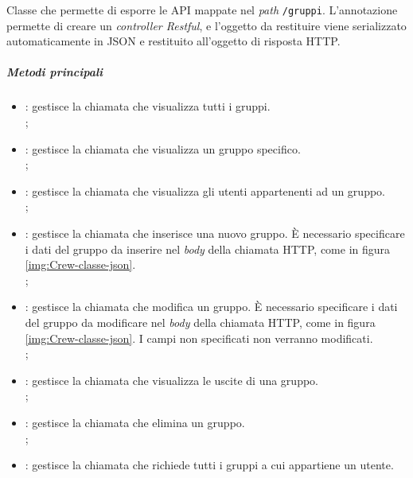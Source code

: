 \label{par:GruppiController}
Classe che permette di esporre le \gls{API} mappate nel \textit{path}
\texttt{/gruppi}.
L'annotazione  permette di creare un \textit{controller
    Restful}, e l'oggetto da restituire viene serializzato automaticamente in
JSON
e restituito all'oggetto di risposta HTTP.
\subparagraph*{Metodi principali}
\begin{itemize}
    \item {}: gestisce la chiamata che visualizza tutti i
          gruppi.\\ ;
    \item {}:  gestisce la chiamata che visualizza un gruppo
          specifico. \\ ;
    \item {}: gestisce la chiamata che visualizza gli
          utenti appartenenti ad un gruppo. \\
          ;
    \item {}: gestisce la chiamata che inserisce una nuovo
          gruppo. È necessario specificare i dati del gruppo da inserire nel
          \textit{body} della chiamata HTTP, come in figura
          \ref{img:Crew-classe-json}.
          \\ ;
    \item {}: gestisce la chiamata che modifica un gruppo. È
          necessario specificare i dati del gruppo da modificare nel
          \textit{body} della
          chiamata HTTP, come in figura \ref{img:Crew-classe-json}. I campi non
          specificati non verranno modificati. \\
          ;
    \item {}: gestisce la chiamata che visualizza le
          uscite di una gruppo.\\ ;
    \item {}: gestisce la chiamata che elimina un gruppo. \\
          ;
    \item {}: gestisce la chiamata che richiede tutti i
          gruppi a cui appartiene un utente. \\

\end{itemize}
